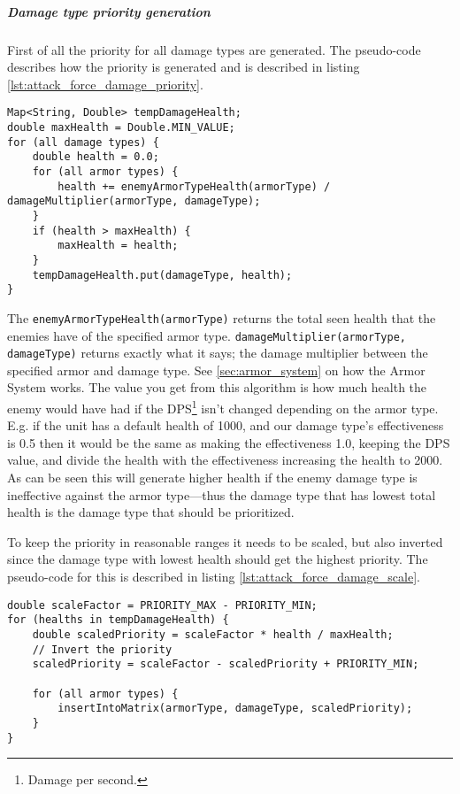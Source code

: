 \subparagraph{Damage type priority generation}
First of all the priority for all damage types are generated. The pseudo-code
describes how the priority is generated and is described in listing
\ref{lst:attack_force_damage_priority}.
\begin{lstfloat}
\begin{lstlisting}[caption={Damage Type Priority},label={lst:attack_force_damage_priority}]
Map<String, Double> tempDamageHealth;
double maxHealth = Double.MIN_VALUE;
for (all damage types) {
	double health = 0.0;
	for (all armor types) {
		health += enemyArmorTypeHealth(armorType) / damageMultiplier(armorType, damageType);
	}
	if (health > maxHealth) {
		maxHealth = health;
	}
	tempDamageHealth.put(damageType, health);
}
\end{lstlisting}
\end{lstfloat}
The \texttt{enemyArmorTypeHealth(armorType)} returns the total seen health that
the enemies have of the specified armor type.
\texttt{damageMultiplier(armorType, damageType)} returns exactly what it says;
the damage multiplier between the specified armor and damage type. See \ref{sec:armor_system} on
how the Armor System works. The value you get from this algorithm is how much health the enemy would have had if the
DPS\footnote{Damage per second.} isn't changed depending on the armor type. E.g. if the unit has
a default health of 1000, and our damage type's effectiveness is 0.5 then it would be the same
as making the effectiveness 1.0, keeping the DPS value, and divide the health with the
effectiveness increasing the health to 2000. As can be seen this will generate higher health if
the enemy damage type is ineffective against the armor type---thus the damage type that has lowest
total health is the damage type that should be prioritized.

To keep the priority in reasonable ranges it needs to be scaled, but also inverted since the damage type with
lowest health should get the highest priority. The pseudo-code for this is
described in listing \ref{lst:attack_force_damage_scale}.
\begin{lstfloat}
\begin{lstlisting}[caption={Damage Type Priority Scaling},label={lst:attack_force_damage_scale}]
double scaleFactor = PRIORITY_MAX - PRIORITY_MIN;
for (healths in tempDamageHealth) {
	double scaledPriority = scaleFactor * health / maxHealth;
	// Invert the priority
	scaledPriority = scaleFactor - scaledPriority + PRIORITY_MIN;
	
	for (all armor types) {
		insertIntoMatrix(armorType, damageType, scaledPriority);
	}
}
\end{lstlisting}
\end{lstfloat}

